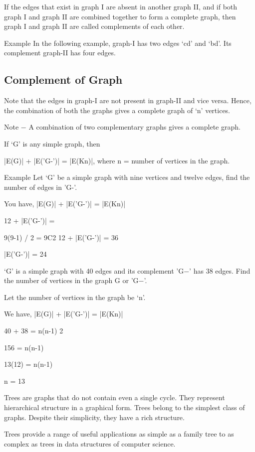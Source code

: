 If the edges that exist in graph I are absent in another graph II, and if both graph I and graph II are combined together to form a complete graph, then graph I and graph II are called complements of each other.

Example
In the following example, graph-I has two edges ‘cd’ and ‘bd’. Its complement graph-II has four edges.

\subsection{Complement of Graph}
Note that the edges in graph-I are not present in graph-II and vice versa. Hence, the combination of both the graphs gives a complete graph of ‘n’ vertices.

Note − A combination of two complementary graphs gives a complete graph.

If ‘G’ is any simple graph, then

|E(G)| + |E('G-')| = |E(Kn)|, where n = number of vertices in the graph.

Example
Let ‘G’ be a simple graph with nine vertices and twelve edges, find the number of edges in 'G-'.

You have, |E(G)| + |E('G-')| = |E(Kn)|

12 + |E('G-')| = 

9(9-1) / 2 = 9C2
12 + |E('G-')| = 36

|E('G-')| = 24

‘G’ is a simple graph with 40 edges and its complement 'G−' has 38 edges. Find the number of vertices in the graph G or 'G−'.

Let the number of vertices in the graph be ‘n’.

We have, |E(G)| + |E('G-')| = |E(Kn)|

40 + 38 = 
n(n-1)
2

156 = n(n-1)

13(12) = n(n-1)

n = 13

\newpage

Trees are graphs that do not contain even a single cycle. They represent hierarchical structure in a graphical form. Trees belong to the simplest class of graphs. Despite their simplicity, they have a rich structure.

Trees provide a range of useful applications as simple as a family tree to as complex as trees in data structures of computer science.
